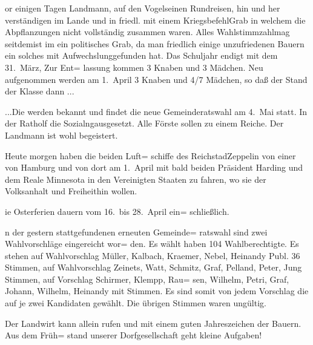 

%
or einigen Tagen Landmann, auf den Vogel\unsicher seinen\ob
Rundreisen, hin und her verständigen im Lande und in\ob
friedl. mit einem Kriegsbefehl\unsicher Grab in welchem\ob
die Abpflanzungen nicht vollständig zusammen waren.\ob
Alles Wahlstimmzahl\unsicher mag seitdem\unsicher ist im ein\ob
{}%
politisches Grab, da man friedlich einige unzufriedenen\ob
Bauern ein solches mit Aufwechslung\unsicher gefunden\ob
hat.\ob
Das Schuljahr endigt mit dem 31.\ März, Zur Ent=\ob
lassung kommen 3 Knaben und 3 Mädchen. Neu\ob
aufgenommen werden am 1.\ April 3 Knaben\ob
und 4/7 Mädchen, so daß der Stand der Klasse dann\ob
...

...Die werden bekannt und findet die neue\ob
Gemeinderatswahl am 4.\ Mai statt.\ob
In der Ratholf die Sozialng\unsicher ausgesetzt. Alle Förste\unsicher\ob
sollen zu einem Reiche. Der Landmann ist wohl\ob
begeistert.

Heute morgen haben die beiden Luft=\ob
schiffe des Reichstad\unsicher Zeppelin von einer von Hamburg\ob
und von dort am 1.\ April mit bald beiden\ob
Präsident Harding und dem Reale Minnesota in\ob
den Vereinigten Staaten zu fahren, wo sie der\ob
Volksanhalt und Freiheit\unsicher hin wollen.

%
ie Osterferien dauern vom 16.\ bis 28.\ April ein=\ob
schließlich.

%
n der gestern stattgefundenen erneuten Gemeinde=\ob
ratswahl sind zwei Wahlvorschläge eingereicht wor=\ob
den. Es wählt haben 104 Wahlberechtigte. Es stehen\ob
auf Wahlvorschlag Müller, Kalbach, Kraemer, Nebel,\ob
Heinandy Publ. 36 Stimmen, auf Wahlvorschlag\ob
Zeinets\unsicher, Watt, Schmitz, Graf, Pelland, Peter, Jung\unsicher{} Stimmen, auf Vorschlag Schirmer, Klempp, Rau=\ob
sen, Wilhelm, Petri, Graf, Johann, Wilhelm, Heinandy mit Stimmen. Es sind somit von jedem Vorschlag\ob
die auf je zwei Kandidaten gewählt. Die übrigen\ob
Stimmen waren ungültig.

Der Landwirt kann allein rufen und mit\ob
einem guten Jahreszeichen der Bauern. Aus dem Früh=\ob
stand unserer Dorfgesellschaft geht kleine Aufgaben!
\pend

